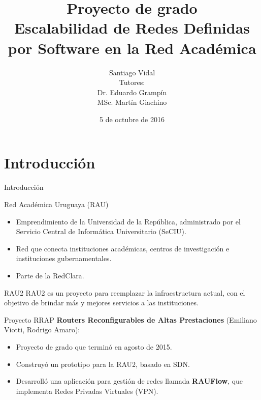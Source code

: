 \documentclass[xcolor=svgnames]{beamer}
\title
	[Escalabilidad de SDN en la RAU]
  {Proyecto de grado \\
  	Escalabilidad de Redes Definidas por Software en la Red Académica}
\author
	[Santiago Vidal]
  {Santiago Vidal \\
  	\vspace{4mm}
  	{\normalfont\small Tutores: \\
  	Dr. Eduardo Grampín \\
  	MSc. Martín Giachino}}
\date
  {5 de octubre de 2016}
\institute
  [UdelaR]
  {Instituto de Computación \\
  	Facultad de Ingeniería \\
  	Universidad de la República}
\begin{document}
\graphicspath{{Figs/}}

\maketitle

\begin{frame}{}
	\tableofcontents
\end{frame}

\section{Introducción}

\begin{frame}
	\tableofcontents[currentsection]
\end{frame}

\begin{frame}{Introducción}
	\begin{block}{Red Académica Uruguaya (RAU)}
		\begin{itemize}
			\item Emprendimiento de la Universidad de la República, administrado por el Servicio Central de Informática Universitario
			(SeCIU).
			\item Red que conecta instituciones académicas, centros de investigación e instituciones gubernamentales.
			\item Parte de la RedClara.
		\end{itemize}
	\end{block}
	\begin{block}{RAU2}
		RAU2 es un proyecto para reemplazar la infraestructura actual, con el objetivo de brindar más y mejores servicios a las instituciones.
	\end{block}
\end{frame}

\begin{frame}{Proyecto RRAP}
	\textbf{Routers Reconfigurables de Altas Prestaciones} (Emiliano Viotti, Rodrigo Amaro):
	\begin{itemize}
		\item Proyecto de grado que terminó en agosto de 2015.
		\item Construyó un prototipo para la RAU2, basado en SDN.
		\item Desarrolló una aplicación para gestión de redes llamada \textbf{RAUFlow}, que implementa Redes Privadas Virtuales (VPN).
	\end{itemize}
\end{frame}
\end{document}
